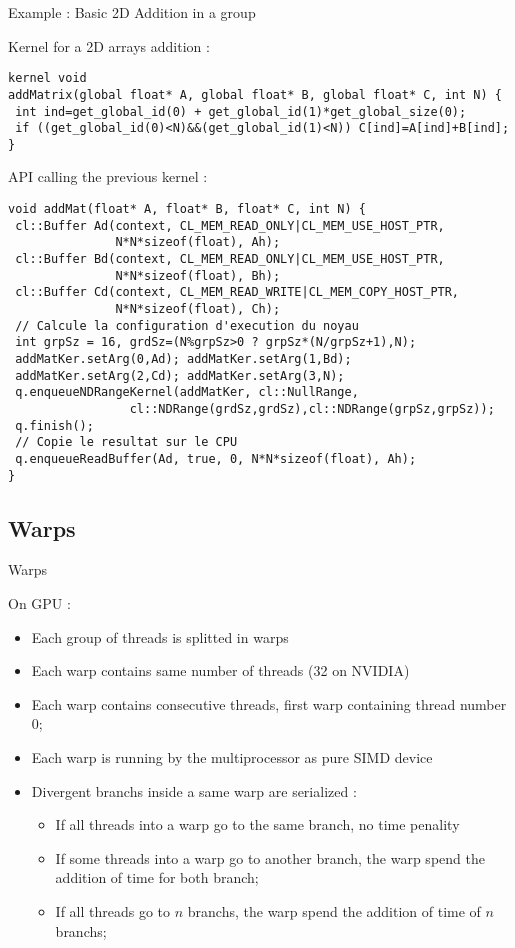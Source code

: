 \documentclass{beamer}
\begin{document}
\begin{frame}[containsverbatim]{Example : Basic 2D Addition in a group}

Kernel for a 2D arrays addition :
{\scriptsize
\begin{lstlisting}
kernel void 
addMatrix(global float* A, global float* B, global float* C, int N) {
 int ind=get_global_id(0) + get_global_id(1)*get_global_size(0);
 if ((get_global_id(0)<N)&&(get_global_id(1)<N)) C[ind]=A[ind]+B[ind];
}
\end{lstlisting}
}
API calling the previous kernel :
{\scriptsize
\begin{lstlisting}
void addMat(float* A, float* B, float* C, int N) {
 cl::Buffer Ad(context, CL_MEM_READ_ONLY|CL_MEM_USE_HOST_PTR, 
               N*N*sizeof(float), Ah);
 cl::Buffer Bd(context, CL_MEM_READ_ONLY|CL_MEM_USE_HOST_PTR, 
               N*N*sizeof(float), Bh);
 cl::Buffer Cd(context, CL_MEM_READ_WRITE|CL_MEM_COPY_HOST_PTR, 
               N*N*sizeof(float), Ch);
 // Calcule la configuration d'execution du noyau
 int grpSz = 16, grdSz=(N%grpSz>0 ? grpSz*(N/grpSz+1),N);
 addMatKer.setArg(0,Ad); addMatKer.setArg(1,Bd);
 addMatKer.setArg(2,Cd); addMatKer.setArg(3,N);
 q.enqueueNDRangeKernel(addMatKer, cl::NullRange,
                 cl::NDRange(grdSz,grdSz),cl::NDRange(grpSz,grpSz));
 q.finish();
 // Copie le resultat sur le CPU
 q.enqueueReadBuffer(Ad, true, 0, N*N*sizeof(float), Ah);
}
\end{lstlisting}
}
\end{frame}

\subsection{Warps}

\begin{frame}{Warps}

On GPU :
\begin{itemize}
\item Each group of threads is splitted in warps
\item Each warp contains same number of threads (32 on NVIDIA)
\item Each warp contains consecutive threads, first warp containing
  thread number 0;
\item Each warp is running by the multiprocessor as pure SIMD device
\item Divergent branchs inside a same warp are serialized :
  \begin{itemize}
  \item If all threads into a warp go to the same branch, no time penality
  \item If some threads into a warp go to another branch, the warp spend
    the addition of time for both branch;
  \item If all threads go to $n$ branchs, the warp spend the addition of 
    time of $n$ branchs;
  \end{itemize}
\end{itemize}
\end{frame}
\end{document}
